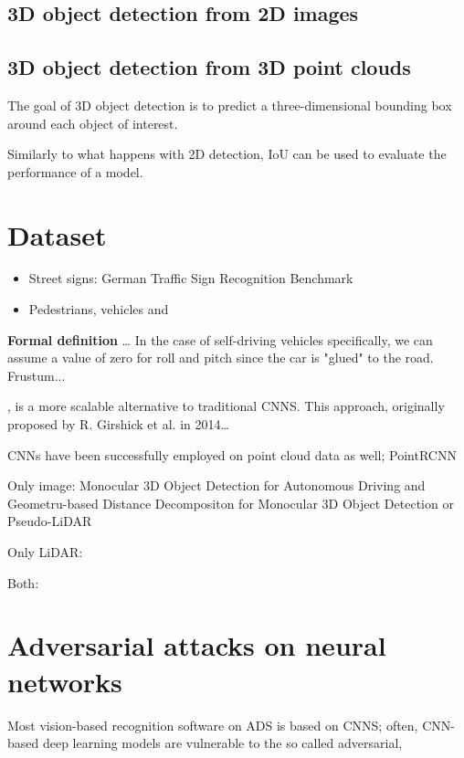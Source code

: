 \subsection{3D object detection from 2D images}

\subsection{3D object detection from 3D point clouds}
The goal of 3D object detection is to predict a three-dimensional bounding box around each object of interest.

Similarly to what happens with 2D detection, IoU can be used to evaluate the performance of a model.


\section*{Dataset}
\begin{itemize}
    \item Street signs: German Traffic Sign Recognition Benchmark
    \item Pedestrians, vehicles and 
\end{itemize}



\textbf{Formal definition}
\dots
In the case of self-driving vehicles specifically, we can assume a value of zero for roll and pitch since the car is "glued" to the road.
Frustum...





, is a more scalable alternative to traditional CNNS. This approach, originally proposed by R. Girshick et al.  in 2014\dots

CNNs have been successfully employed on point cloud data as well; PointRCNN





Only image: Monocular 3D Object Detection for Autonomous Driving and Geometru-based Distance Decompositon for Monocular 3D Object Detection or Pseudo-LiDAR

Only LiDAR: 

Both:





\newpage
\section{Adversarial attacks on neural networks}
Most vision-based recognition software on ADS is based on CNNS; often, CNN-based deep learning models are vulnerable to the so called adversarial, 

